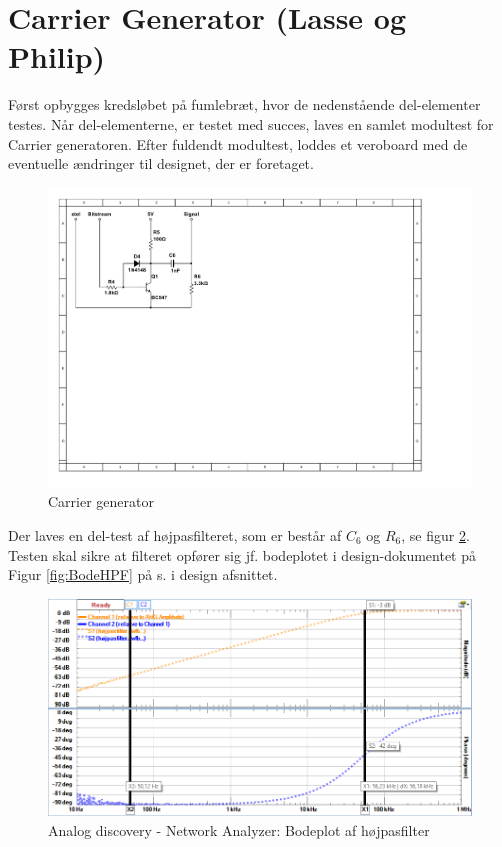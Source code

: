\section{Carrier Generator (Lasse og Philip)}

Først opbygges kredsløbet på fumlebræt, hvor de nedenstående del-elementer testes. Når del-elementerne, er testet med succes, laves en samlet modultest for Carrier generatoren.  Efter fuldendt modultest, loddes et veroboard med de eventuelle ændringer til designet, der er foretaget.

\begin{figure}[h]
	\centering
	\includegraphics[scale=0.8, trim=45 355 525 45, clip=true]{../HardwareDesign/Diagrammer/CarrierGenerator.pdf}
	\caption{Carrier generator}
	\label{fig:CarrierGen}
\end{figure}

Der laves en del-test af højpasfilteret, som er består af $C_{6}$ og $R_{6}$, se figur \ref{fig:bodePlotHPFImpl}. Testen skal sikre at filteret opfører sig jf. bodeplotet i design-dokumentet på Figur \ref{fig:BodeHPF} på s. \pageref{fig:BodeHPF} i design afsnittet.

\begin{figure}[h]
	\centering
	\includegraphics[width={\textwidth - 0.5 cm}, trim=0 0 0 0, clip=true]{../Implementering/billeder/BodePlotHPFLille.png}
	\caption{Analog discovery - Network Analyzer: Bodeplot af højpasfilter}
	\label{fig:bodePlotHPFImpl}
\end{figure}

